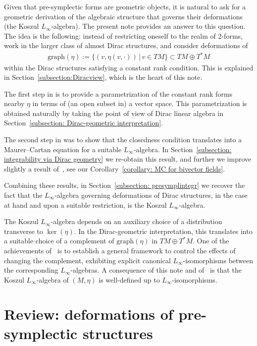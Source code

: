 \documentclass[pdftex]{sigma}
\numberwithin{equation}{section}
\renewcommand{\graph}{\mathrm{graph}}
\renewcommand{\graph}{\mathrm{graph}}
\begin{document}
Given that pre-symplectic forms are geometric objects, it is natural to ask for a geometric derivation of the algebraic structure that governs their deformations (the Koszul $L_{\infty}$-algebra). The present note provides an answer to this question. The idea is the following: instead of restricting oneself to the realm of 2-forms, work in the larger class of almost Dirac structures, and consider deformations of
 \begin{gather*}\graph(\eta) := \{(v,\eta(v,\cdot)) \, | \, v \in TM \} \subset TM \oplus T^*M\end{gather*}
 within the Dirac structures satisfying a constant rank condition. This is explained in Section~\ref{subsection:Diracview}, which is the heart of this note.

 The first step in \cite{SZPre} is to provide a parametrization of the constant rank forms nearby $\eta$ in terms of (an open subset in) a vector space. This parametrization is obtained naturally by taking the point of view of Dirac linear algebra in Section~\ref{subsection: Dirac-geometric interpretation}.

 The second step in \cite{SZPre} was to show that the closedness condition translates into a Maurer--Cartan equation for a suitable $L_{\infty}$-algebra. In Section~\ref{subsection: integrability via Dirac geometry} we re-obtain this result, and further we improve slightly a result of~\cite{SZPre}, see our Corollary~\ref{corollary: MC for bivector fields}.

Combining these results, in Section~\ref{subsection: presymplintegr} we recover the fact that the $L_{\infty}$-algebra governing deformations of Dirac structures, in the case at hand and upon a suitable restriction, is the Koszul $L_{\infty}$-algebra.

The Koszul $L_{\infty}$-algebra depends on an auxiliary choice of a distribution transverse to $\ker(\eta)$. In the Dirac-geometric interpretation, this translates into a suitable choice of a complement of $\graph(\eta)$ in $TM\oplus T^*M$. One of the achievements of~\cite{GMS} is to establish a general framework to control the effects of changing the complement, exhibiting explicit canonical $L_{\infty}$-isomorphisms between the corresponding $L_{\infty}$-algebras. A consequence of this note and of~\cite{GMS} is that the Koszul $L_{\infty}$-algebra of $(M,\eta)$ is well-defined up to $L_{\infty}$-isomorphisms.

\section{Review: deformations of pre-symplectic structures}\label{section: pre-symplectic structures}
\end{document}
